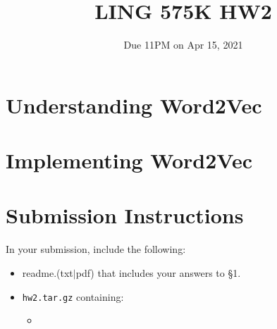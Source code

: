 \documentclass[11pt]{article}
\begin{document}
\title{LING 575K HW2}
\date{\vspace{-0.2in}Due 11PM on Apr 15, 2021}
\maketitle


\section{Understanding Word2Vec}


\section{Implementing Word2Vec}

\vspace{2em}

\section*{Submission Instructions}

In your submission, include the following:
\begin{itemize}
  \item readme.(txt$\mid$pdf) that includes your answers to \S1. 
  \item \texttt{hw2.tar.gz} containing:
  \begin{itemize}
    \item 
  \end{itemize}
\end{itemize}
\end{document}
